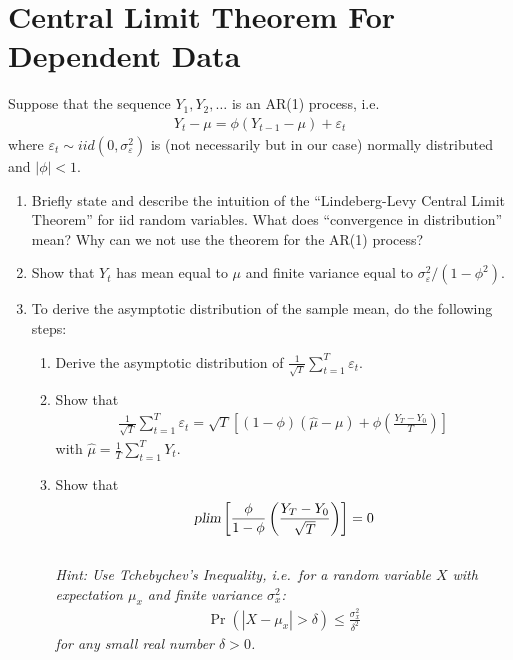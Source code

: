 \section[Central Limit Theorem For Dependent Data]{Central Limit Theorem For Dependent Data\label{ex:CentralLimitTheoremDependentData}}
Suppose that the sequence \(Y_{1},Y_{2},\ldots \) is an AR{(1)} process, i.e.\
\begin{align*}
Y_{t}-\mu =\phi \left(Y_{t-1}-\mu\right) +\varepsilon _{t}
\end{align*}
where \(\varepsilon _{t}\sim iid(0,\sigma _{\varepsilon }^{2})\) is
(not necessarily but in our case) normally distributed and \(|\phi |<1\).

\begin{enumerate}
\item
Briefly state and describe the intuition of the \enquote{Lindeberg-Levy Central Limit Theorem} for iid random variables.
What does \enquote{convergence in distribution} mean?
Why can we not use the theorem for the AR{(1)} process?

\item
Show that \(Y_t\) has mean equal to \(\mu \) and finite variance equal to \(\sigma_\varepsilon^2/(1-\phi^2)\).

\item To derive the asymptotic distribution of the sample mean, do the following steps:
\begin{enumerate}
  \item
  Derive the asymptotic distribution of \(\frac{1}{\sqrt{T} } \sum_{t=1}^T \varepsilon_t\).

  \item
   Show that
  \begin{align*}
  \frac{1}{\sqrt{T}} \sum_{t=1}^T \varepsilon_t = \sqrt{T}\left[(1-\phi)\left(\hat{\mu}-\mu\right) + \phi\left(\frac{Y_T - Y_0}{T}\right)\right]
  \end{align*}
  with \(\hat{\mu} =\frac{1}{T}\sum_{t=1}^{T}Y_{t}\).

  \item
  Show that
  \begin{align*}
  \textsl{plim}\left[\frac{\phi}{1-\phi}\left(\frac{Y_T - Y_0}{\sqrt{T}}\right)\right] = 0
  \end{align*}
  \\
  \emph{Hint: Use Tchebychev's Inequality,
  i.e.\ for a random variable \(X\) with expectation \(\mu_x\)
  and finite variance \(\sigma_x^2\):}
  \begin{align*}
  \Pr(|X-\mu_x|> \delta) \leq \frac{\sigma_x^2}{\delta^2}
  \end{align*}
  \emph{for any small real number \(\delta>0\).}


\end{enumerate}
\end{enumerate}
